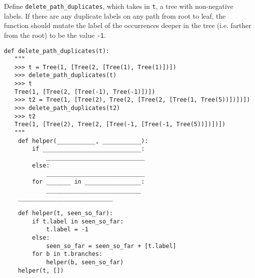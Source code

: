 \begin{blocksection}
\question
Define \texttt{delete\_path\_duplicates}, which takes in \texttt{t}, a tree
with non-negative labels. If there are any duplicate labels on any path 
from root to leaf, the function should mutate the label of the occurrences
deeper in the tree (i.e. farther from the root) to be the value \texttt{-1}.

\begin{lstlisting}
def delete_path_duplicates(t):
   """
   >>> t = Tree(1, [Tree(2, [Tree(1), Tree(1)])])
   >>> delete_path_duplicates(t)
   >>> t
   Tree(1, [Tree(2, [Tree(-1), Tree(-1)])])
   >>> t2 = Tree(1, [Tree(2), Tree(2, [Tree(2, [Tree(1, Tree(5))])])])
   >>> delete_path_duplicates(t2)
   >>> t2
   Tree(1, [Tree(2), Tree(2, [Tree(-1, [Tree(-1, Tree(5))])])])
   """
    def helper(___________, ___________):
        if ____________________________:
            ____________________________
        else:
            ____________________________
        for _______ in ________________:
            ___________________________
    ___________________________

\end{lstlisting}

\begin{solution}
\begin{lstlisting}
    def helper(t, seen_so_far):
        if t.label in seen_so_far:
            t.label = -1
        else:
            seen_so_far = seen_so_far + [t.label]
        for b in t.branches:
            helper(b, seen_so_far)
    helper(t, [])
\end{lstlisting}
\end{solution}
\end{blocksection}